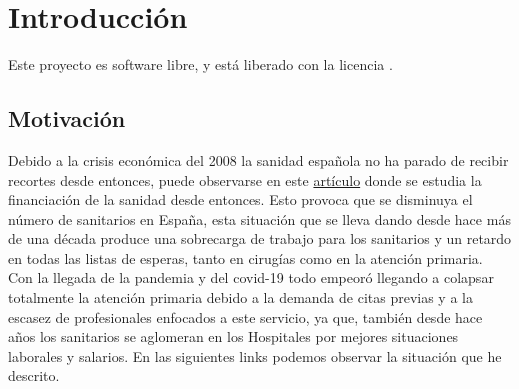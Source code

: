 \chapter{Introducción}

Este proyecto es software libre, y está liberado con la licencia \cite{gplv3}.

\section{Motivación}
Debido a la crisis económica del 2008 la sanidad española no ha parado de recibir recortes desde entonces, puede observarse en este
\href{https://www.consalud.es/politica/decada-recortes-2009-2018-efectos-infrafinanciacion-sanidad_87083_102.html}{artículo} donde
se estudia la financiación de la sanidad desde entonces. Esto provoca que se disminuya el número de sanitarios en España, 
esta situación que se lleva dando desde hace más de una década produce una sobrecarga de trabajo para los sanitarios y un retardo 
en todas las listas de esperas, tanto en cirugías como en la atención primaria. 
Con la llegada de la pandemia y del covid-19 todo empeoró llegando a colapsar totalmente la atención primaria debido a la demanda
de citas previas y a la escasez de profesionales enfocados a este servicio, ya que, también desde hace años los sanitarios se aglomeran
en los Hospitales por mejores situaciones laborales y salarios. En las siguientes links podemos observar la situación que he descrito.
